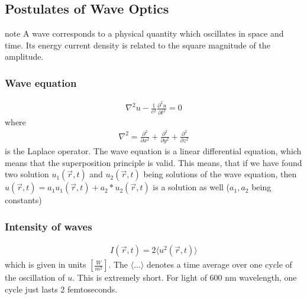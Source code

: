 \documentclass[letterpaper,10pt,english]{sphinxmanual}
\begin{document}
\subsection{Postulates of Wave Optics}
\label{\detokenize{notebooks/L8/Wave Optics:Postulates-of-Wave-Optics}}
\begin{sphinxadmonition}{note}{}\unskip
A wave corresponds to a physical quantity which oscillates in space and time. Its energy current density is related to the square magnitude of the amplitude.
\end{sphinxadmonition}


\subsubsection{Wave equation}
\label{\detokenize{notebooks/L8/Wave Optics:Wave-equation}}\begin{equation*}
\begin{split}\nabla^2 u - \frac{1}{c^2}\frac{\partial^2 u}{\partial t^2}=0\end{split}
\end{equation*}
where
\begin{equation*}
\begin{split}\nabla^2 =\frac{\partial^2}{\partial x^2}+\frac{\partial^2}{\partial y^2}+\frac{\partial^2}{\partial z^2}\end{split}
\end{equation*}
is the Laplace operator. The wave equation is a linear differential equation, which means that the superposition principle is valid. This means, that if we have found two solution \(u_1(\vec{r},t)\) and \(u_2(\vec{r},t)\) being solutions of the wave equation, then \(u(\vec{r},t)=a_1 u_1(\vec{r},t)+a_2*u_2(\vec{r},t)\) is a solution as well (\(a_1,a_2\) being constants)


\subsubsection{Intensity of waves}
\label{\detokenize{notebooks/L8/Wave Optics:Intensity-of-waves}}\begin{equation*}
\begin{split}I(\vec{r},t)=2\langle u^2(\vec{r},t)\rangle\end{split}
\end{equation*}
which is given in units \(\left[\frac{W}{m^2}\right]\). The \(\langle \ldots \rangle\) denotes a time average over one cycle of the oscillation of \(u\). This is extremely short. For light of 600 nm wavelength, one cycle just lasts 2 femtoseconds.
\end{document}
